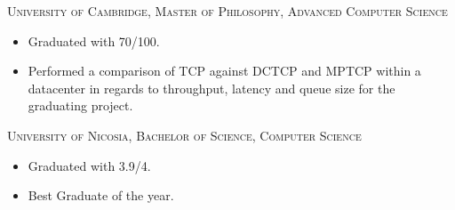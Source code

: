 %
%
%

	\begin{scholarship}
			{
				\textsc{University of Cambridge, Master of Philosophy, Advanced Computer Science}
				\begin{itemize}
					\item Graduated with 70/100.
					\item Performed a comparison of TCP against DCTCP and MPTCP within a datacenter in regards to throughput, latency and queue size for the graduating project.
				\end{itemize}
			}
			{
				\textsc{University of Nicosia, Bachelor of Science, Computer Science}
				\begin{itemize}
					\item Graduated with 3.9/4.
					\item Best Graduate of the year.
				\end{itemize}
			}
	\end{scholarship}